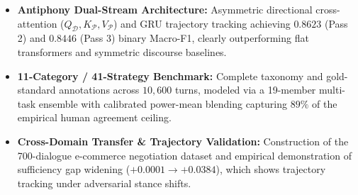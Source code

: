 \begin{summarybox}
\begin{itemize}
  \item \textbf{Antiphony Dual-Stream Architecture:} Asymmetric directional cross-attention ($Q_{\mathcal{D}}, K_{\mathcal{P}}, V_{\mathcal{P}}$) and GRU trajectory tracking achieving $0.8623$ (Pass 2) and $0.8446$ (Pass 3) binary Macro-F1, clearly outperforming flat transformers and symmetric discourse baselines.
  \item \textbf{11-Category / 41-Strategy Benchmark:} Complete taxonomy and gold-standard annotations across $10{,}600$ turns, modeled via a 19-member multi-task ensemble with calibrated power-mean blending capturing $89\%$ of the empirical human agreement ceiling.
  \item \textbf{Cross-Domain Transfer \& Trajectory Validation:} Construction of the 700-dialogue e-commerce negotiation dataset and empirical demonstration of sufficiency gap widening ($+0.0001 \to +0.0384$), which shows trajectory tracking under adversarial stance shifts.
\end{itemize}
\end{summarybox}

